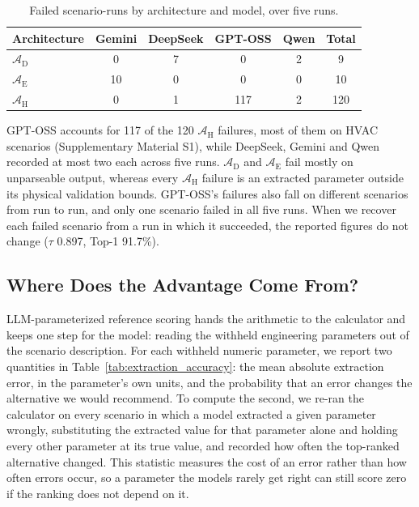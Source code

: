 \documentclass[final,3p,times]{elsarticle}
\begin{document}
\begin{table}[htbp]
\caption{Failed scenario-runs by architecture and model, over five runs.}
\label{tab:failure_arch_model}
\centering
\begin{threeparttable}
\small\centering
\begin{tabular}{lccccc}
\toprule
Architecture & Gemini & DeepSeek & GPT-OSS & Qwen & Total \\
\midrule
$\mathcal{A}_{\text{D}}$ & 0 & 7 & 0 & 2 & 9 \\
$\mathcal{A}_{\text{E}}$ & 10 & 0 & 0 & 0 & 10 \\
$\mathcal{A}_{\text{H}}$ & 0 & 1 & 117 & 2 & 120 \\
\bottomrule
\end{tabular}
\end{threeparttable}
\end{table}

GPT-OSS accounts for 117 of the 120 $\mathcal{A}_{\text{H}}$ failures, most of them on HVAC scenarios (Supplementary Material S1), while DeepSeek, Gemini and Qwen recorded at most two each across five runs. $\mathcal{A}_{\text{D}}$ and $\mathcal{A}_{\text{E}}$ fail mostly on unparseable output, whereas every $\mathcal{A}_{\text{H}}$ failure is an extracted parameter outside its physical validation bounds. GPT-OSS's failures also fall on different scenarios from run to run, and only one scenario failed in all five runs. When we recover each failed scenario from a run in which it succeeded, the reported figures do not change ($\tau$ 0.897, Top-1 91.7\%).

\FloatBarrier
\subsection{Where Does the Advantage Come From?}
\label{sec:res-extraction}
LLM-parameterized reference scoring hands the arithmetic to the calculator and keeps one step for the model: reading the withheld engineering parameters out of the scenario description. For each withheld numeric parameter, we report two quantities in Table~\ref{tab:extraction_accuracy}: the mean absolute extraction error, in the parameter's own units, and the probability that an error changes the alternative we would recommend. To compute the second, we re-ran the calculator on every scenario in which a model extracted a given parameter wrongly, substituting the extracted value for that parameter alone and holding every other parameter at its true value, and recorded how often the top-ranked alternative changed. This statistic measures the cost of an error rather than how often errors occur, so a parameter the models rarely get right can still score zero if the ranking does not depend on it.
\end{document}
